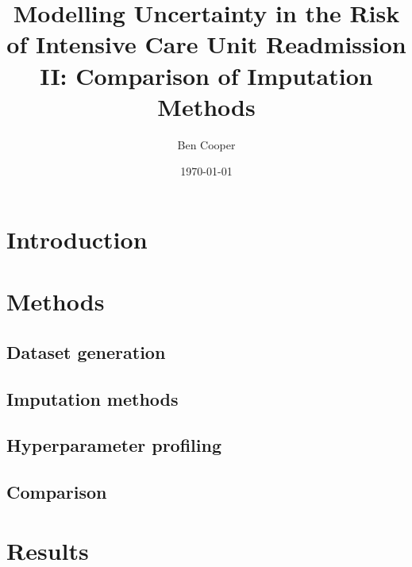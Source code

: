 \documentclass[onecolumn]{article}
\title{Modelling Uncertainty in the Risk of Intensive Care Unit Readmission II: Comparison of Imputation Methods}
\date{\today}
\author{Ben Cooper}
\begin{document}
\maketitle

\section{Introduction}


\section{Methods}

\subsection{Dataset generation}


\subsection{Imputation methods}


\subsection{Hyperparameter profiling}


\subsection{Comparison}


\section{Results}


\begin{multicols}{2}

{\small
}

\end{multicols}
\end{document}
